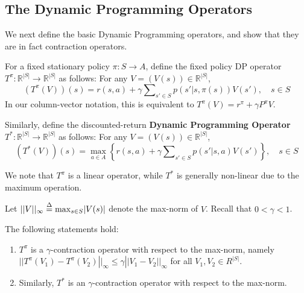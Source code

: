 \subsection{The Dynamic Programming Operators}\label{ss:DP_op}
We next define the basic Dynamic Programming operators, and show that they are in fact contraction operators.

For a fixed stationary policy $\pi :S \to A$, define the fixed policy DP operator $T^\pi:\mathbb R^{|S|} \to \mathbb R^{|S|}$  as follows: For any $V=(V(s))\in \mathbb R^{|S|}$,
\[(T_{}^\pi (V))(s) = r(s,a) + \gamma \sum\nolimits_{s' \in S} {p(s'|s,\pi (s))V(s')} ,\quad s \in S\]
In our column-vector notation, this is equivalent to  $T_{}^\pi (V) = {r^\pi } + \gamma {P^\pi }V$.

Similarly, define the discounted-return \textbf{Dynamic Programming Operator}  $T^*:\mathbb R^{|S|} \to \mathbb R^{|S|}$ as follows: For any $V=(V(s))\in \mathbb R^{|S|}$,
\[(T_{}^*(V))(s) = \mathop {\max }\limits_{a \in A} \left\{ {r(s,a) + \gamma \sum\nolimits_{s' \in S} {p(s'|s,a)V(s')} } \right\},\quad s \in S\]

We note that $T_{}^\pi $ is a linear operator, while $T_{}^*$ is generally non-linear due to the maximum operation.

Let $||V|{|_\infty } \buildrel \Delta \over = {\max _{s \in S}}|V(s)|$ denote the max-norm of $V$.  Recall that $0 < \gamma  < 1$.

\begin{theorem} The following statements hold:
\begin{enumerate}
  \item $T_{}^\pi $ is a $\gamma$-contraction operator with respect to the max-norm,  namely
                      $||T_{}^\pi ({V_1}) - T_{}^\pi ({V_2})|{|_\infty } \le \gamma ||{V_1} - {V_2}|{|_\infty }$ for all $V_1,V_2\in R^{|S|}$.
  \item Similarly, $T_{}^*$ is an $\gamma$-contraction operator with respect to the max-norm.
\end{enumerate}
\end{theorem}

